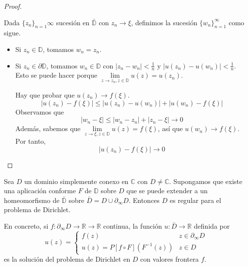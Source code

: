 \begin{proof}
\begin{enumerate}
              Dada $\{z_n\}_{n=1}\infty$ sucesión en $\bar{\mathbb{D}}$ con $z_n \to \xi$, definimos la sucesión $\{w_n\}_{n=1}^\infty$ como sigue.
              \begin{itemize}
                  \item Si $z_n \in \mathbb{D}$, tomamos $w_n = z_n$.
                  \item Si $z_n \in \partial\mathbb{D}$, tomamos $w_n \in \mathbb{D}$ con $|z_n-w_n| < \frac{1}{n}$ y $|u(z_n)-u(w_n)| < \frac{1}{n}$.
                        Esto se puede hacer porque $\lim\limits_{z \to z_n, z \in \mathbb{D}} u(z) = u(z_n)$.

                        Hay que probar que $u(z_n) \to f(\xi)$.
                        $$|u(z_n)-f(\xi)| \leq |u(z_n)-u(w_n)| + |u(w_n)-f(\xi)|$$
                        Observamos que
                        $$|w_n-\xi| \leq |w_n-z_n| + |z_n-\xi| \to 0$$
                        Además, sabemos que $\lim\limits_{z \to \xi, z \in \mathbb{D}} u(z) = f(\xi)$, así que $u(w_n) \to f(\xi)$.
                        Por tanto,
                        $$|u(z_n) - f(\xi)| \to 0$$
              \end{itemize}
    \end{enumerate}
\end{proof}

\begin{theorem}
    Sea $D$ un dominio simplemente conexo en $\mathbb{C}$ con $D \neq \mathbb{C}$.
    Supongamos que existe una aplicación conforme $F$ de $\mathbb{D}$ sobre $D$ que se puede extender a un homeomorfismo de $\bar{\mathbb{D}}$ sobre $\bar{D} = D \cup \partial_\infty D$.
    Entonces $D$ es regular para el problema de Dirichlet.

    En concreto, si $f: \partial_\infty D \to \mathbb{R} \to \mathbb{R}$ continua, la función $u: \bar{D} \to \mathbb{R}$ definida por
    $$u(z) = \begin{cases}
            f(z)                           & z \in \partial_\infty D \\
            u(z) = P[f \circ F](F^{-1}(z)) & z \in D
        \end{cases}$$
    es la solución del problema de Dirichlet en $D$ con valores frontera $f$.
\end{theorem}

